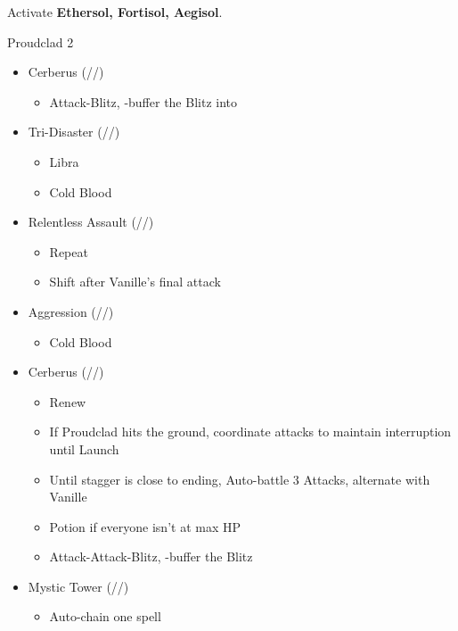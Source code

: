 \begin{paracol}{2}
\switchcolumn*
Activate \textbf{Ethersol, Fortisol, Aegisol}.
\renewcommand{\first}{[1] Aggression (\rav/\com/\com)}
\renewcommand{\second}{[2] Cerberus (\com/\com/\com)}
\renewcommand{\third}{[3] Mystic Tower (\rav/\sen/\rav)}
\renewcommand{\fourth}{[4] Solidarity (\com/\sen/\med)}
\renewcommand{\fifth}{[5] Relentless Assault (\rav/\com/\rav)}
\renewcommand{\sixth}{[6] Tri-Disaster (\rav/\rav/\rav)}
\begin{battle}{Proudclad 2}
		\begin{itemize}
			\item \second
			      \begin{itemize}
				      \item Attack-Blitz, \rav-buffer the Blitz into
			      \end{itemize}
			\item \sixth
			      \begin{itemize}
				      \item Libra
				      \item Cold Blood
			      \end{itemize}
			\item \fifth
			      \begin{itemize}
				      \item Repeat
				      \item Shift after Vanille's final attack
			      \end{itemize}
			\item \first
			      \begin{itemize}
				      \item Cold Blood
			      \end{itemize}
			\item \second
			      \begin{itemize}
				      \item Renew
				      \item If Proudclad hits the ground, coordinate attacks to maintain interruption until Launch
				      \item Until stagger is close to ending, Auto-battle 3 Attacks, alternate with Vanille
				      \item Potion if everyone isn't at max HP
				      \item Attack-Attack-Blitz, \rav-buffer the Blitz
			      \end{itemize}
			\item \third
			      \begin{itemize}
				      \item Auto-chain one spell

\end{itemize}
\end{itemize}
\end{battle}
\end{paracol}
